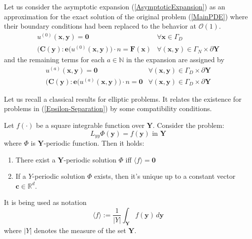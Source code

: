 Let us consider the asymptotic expansion (\ref{AsymptoticExpansion}) as an approximation for the exact solution of the original problem (\ref{MainPDE}) where their boundary conditions had been replaced to the behavior at $\mathcal{O}(1)$.
\begin{equation*}
    \begin{array}{cc}   
        u^{(0)}(\mathbf{x},\mathbf{y}) = \mathbf{0} & \forall \mathbf{x} \in \Gamma_D\\
        \big(\mathbf{C}(\mathbf{y}): \mathbf{e} (u^{(0)}(\mathbf{x}, \mathbf{y}) \big) \cdot n = \hat{\mathbf{F}}(\mathbf{x}) & \forall (\mathbf{x},\mathbf{y}) \in \Gamma_N \times \partial \mathbf{Y}
    \end{array}
\end{equation*}
and the remaining terms for each $a \in \mathbb{N}$ in the expansion are assigned by
\begin{equation*}
    \begin{array}{cc}
        u^{(a)}(\mathbf{x},\mathbf{y}) = \mathbf{0} & \forall (\mathbf{x}, \mathbf{y}) \in \Gamma_D\times \partial \mathbf{Y} \\
        \big( \mathbf{C}(\mathbf{y}): \mathbf{e} (u^{(a)}(\mathbf{x},\mathbf{y}) \big) \cdot n = \mathbf{0} & \forall  (\mathbf{x}, \mathbf{y}) \in \Gamma_D\times \partial \mathbf{Y} 
    \end{array}
\end{equation*}

Let us recall a classical results for elliptic problems. It relates the existence for problems in (\ref{Epsilon-Separation}) by some compatibility conditions.
\begin{lem}
\label{ExistenceLemma}
Let $f(\cdot)$ be a square integrable function over $\mathbf{Y}$. Consider the problem:
\begin{equation*}
    L_{yy} \Phi(\mathbf{y}) = f(\mathbf{y}) \text{ in } \mathbf{Y}
\end{equation*}
where $\Phi$ is $\mathbf{Y}$-periodic function. Then it holds:
\begin{enumerate}
    \item There exist a $\mathbf{Y}$-periodic solution $\Phi$ iff $\langle f \rangle = \mathbf{0}$
    \item If a $Y$-periodic solution $\Phi$ exists, then it's unique up to a constant vector $\mathbf{c} \in \mathbb{R}^d$.
\end{enumerate}
\end{lem}

\begin{rem}
It is being used as notation
\begin{equation*}
    \langle f \rangle := \frac{1}{\vert Y \vert} \int_{\mathbf{Y}} f(\mathbf{y}) \, d\mathbf{y}
\end{equation*}
where $\vert Y \vert$ denotes the measure of the set $\mathbf{Y}$.
\end{rem}


